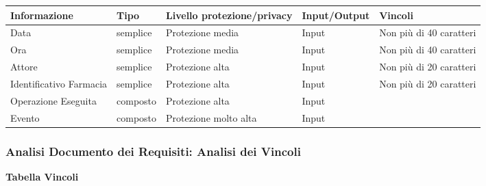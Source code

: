 \begin{tabular} {|P{3cm}|P{3cm}|P{3cm}|P{3cm}|P{3cm}|}
    \hline
    \textbf{Informazione}   & \textbf{Tipo} & \textbf{Livello protezione/privacy} & \textbf{Input/Output} & \textbf{Vincoli}        \\
    \hline
    Data                    & semplice      & Protezione media                    & Input                 & Non più di 40 caratteri \\
    \hline
    Ora                     & semplice      & Protezione media                    & Input                 & Non più di 40 caratteri \\
    \hline
    Attore                  & semplice      & Protezione alta                     & Input                 & Non più di 20 caratteri \\
    \hline
    Identificativo Farmacia & semplice      & Protezione alta                     & Input                 & Non più di 20 caratteri \\
    \hline
    Operazione Eseguita     & composto      & Protezione alta                     & Input                 &                         \\
    \hline
    Evento                  & composto      & Protezione molto alta               & Input                 &                         \\
    \hline
\end{tabular}

\newpage
\subsubsection{Analisi Documento dei Requisiti: Analisi dei Vincoli}
\hfill \break

\textbf{Tabella Vincoli}
\hfill \break


